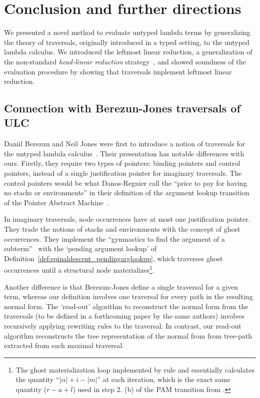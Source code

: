 \documentclass{elsarticle}
\theoremstyle{plain}
\theoremstyle{definition}
\theoremstyle{remark}
\newcommand{\ghostlmd}{{\lambda\!\!\lambda}}
\begin{document}
\section{Conclusion and further directions}

We presented a novel method to evaluate untyped lambda terms by generalizing the theory of traversals, originally introduced in a typed setting, to the untyped lambda calculus. We introduced the leftmost linear reduction, a generalization of the non-standard \emph{head-linear reduction} strategy~\cite{danos-head}, and showed soundness of the evaluation procedure by showing that traversals implement leftmost linear reduction.

\subsection*{Connection with Berezun-Jones traversals of ULC}

Daniil Berezun and Neil Jones were first to introduce a notion of traversals for the untyped lambda calculus~\cite{JonesBerezunLLL}. Their presentation has notable differences with ours. Firstly, they require two types of pointers: binding pointers and control pointers, instead of a single justification pointer for imaginary traversals.
The control pointers would be what Danos-Regnier call the ``price to pay for having no stacks or environments'' in their definition of the argument lookup transition of the Pointer Abstract Machine~\cite{danos-head}.

In imaginary traversals, node occurrences have at most one justification pointer. They trade the notions of stacks and environments with the concept of ghost occurrences. They implement the ``gymnastics to find the argument of a subterm''~\cite{danos-head} with the `pending argument lookup' of Definition~\ref{def:spinaldescent_pendingarglookup}, which traverses ghost occurrences until a structural node materializes\footnote{The ghost materialization loop  implemented by
rule \rulenamet{Lam^\ghostlmd} and  essentially calculates the quantity ``$|\alpha|+i-|m|$'' at each iteration, which is the exact same quantity ($r-a+l$) used in step 2. (b) of the PAM transition from \cite{danos-head}.}.

Another difference is that Berezun-Jones define a single traversal for a given term, whereas our definition involves one traversal for every path in the resulting normal form. The `read-out' algorithm to reconstruct the normal form from the traversals (to be defined in a forthcoming paper by the same authors) involves recursively applying rewriting rules to the traversal. In contrast, our read-out algorithm reconstructs the tree representation of the normal from from tree-path extracted from each maximal traversal.
\end{document}
